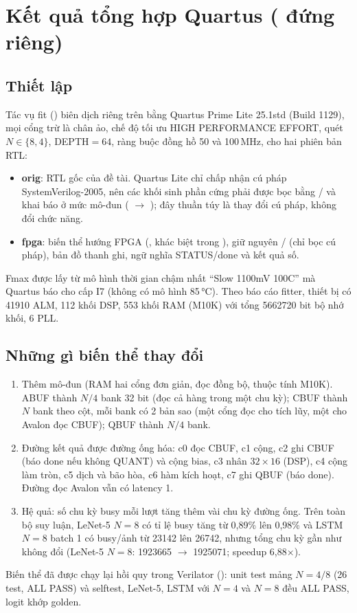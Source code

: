 \section{Kết quả tổng hợp Quartus ( đứng riêng)}
\label{sec:quartus}
\subsection{Thiết lập}
Tác vụ fit () biên dịch riêng  trên  bằng Quartus Prime Lite 25.1std (Build 1129), mọi cổng trừ  là chân ảo, chế độ tối ưu HIGH PERFORMANCE EFFORT, quét $N\in\{8,4\}$, DEPTH$=64$, ràng buộc đồng hồ 50 và 100\,MHz, cho hai phiên bản RTL:
\begin{itemize}
  \item \textbf{orig}: RTL gốc của đề tài. Quartus Lite chỉ chấp nhận cú pháp SystemVerilog-2005, nên các khối  sinh phần cứng phải được bọc bằng / và khai báo  ở mức mô-đun ( $\to$ ); đây thuần túy là thay đổi cú pháp, không đổi chức năng.
  \item \textbf{fpga}: biến thể hướng FPGA (, khác biệt trong ), giữ nguyên / (chỉ bọc cú pháp), bản đồ thanh ghi, ngữ nghĩa STATUS/done và kết quả số.
\end{itemize}
Fmax được lấy từ mô hình thời gian chậm nhất ``Slow 1100mV 100C'' mà Quartus báo cho cấp I7 (không có mô hình 85\,°C). Theo báo cáo fitter, thiết bị có \num{41910} ALM, 112 khối DSP, 553 khối RAM (M10K) với tổng \num{5662720} bit bộ nhớ khối, 6 PLL.

\subsection{Những gì biến thể  thay đổi}
\begin{enumerate}
  \item Thêm mô-đun  (RAM hai cổng đơn giản, đọc đồng bộ, thuộc tính  M10K). ABUF thành $N/4$ bank 32 bit (đọc cả hàng trong một chu kỳ); CBUF thành $N$ bank theo cột, mỗi bank có 2 bản sao (một cổng đọc cho tích lũy, một cho Avalon đọc CBUF); QBUF thành $N/4$ bank.
  \item Đường kết quả được đường ống hóa: c0 đọc CBUF, c1 cộng, c2 ghi CBUF (báo done nếu không QUANT) và cộng bias, c3 nhân $32\times16$ (DSP), c4 cộng làm tròn, c5 dịch và bão hòa, c6 hàm kích hoạt, c7 ghi QBUF (báo done). Đường đọc Avalon vẫn có latency 1.
  \item Hệ quả: số chu kỳ busy mỗi lượt tăng thêm vài chu kỳ đường ống. Trên toàn bộ suy luận, LeNet-5 $N=8$ có tỉ lệ busy tăng từ 0,89\% lên 0,98\% và LSTM $N=8$ batch 1 có busy/ảnh từ \num{23142} lên \num{26742}, nhưng tổng chu kỳ \NPU{} gần như không đổi (LeNet-5 $N=8$: \num{1923665} $\to$ \num{1925071}; speedup 6,88$\times$).
\end{enumerate}
Biến thể đã được chạy lại hồi quy trong Verilator (): unit test mảng $N=4/8$ (26 test, ALL PASS) và selftest, LeNet-5, LSTM với $N=4$ và $N=8$ đều ALL PASS, logit khớp golden.

